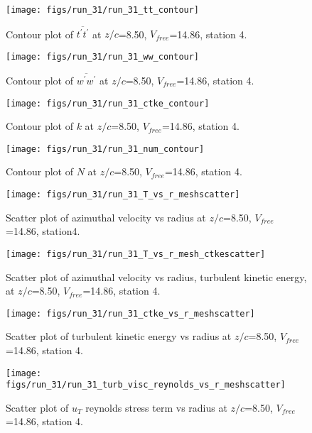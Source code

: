 \begin{figure}[H]
\centering
\texttt{[image: figs/run\_31/run\_31\_tt\_contour]}
\caption{Contour plot of $\overline{t^\prime t^\prime}$ at $z/c$=8.50, $V_{free}$=14.86, station 4.}
\end{figure}


\begin{figure}[H]
\centering
\texttt{[image: figs/run\_31/run\_31\_ww\_contour]}
\caption{Contour plot of $\overline{w^\prime w^\prime}$ at $z/c$=8.50, $V_{free}$=14.86, station 4.}
\end{figure}


\begin{figure}[H]
\centering
\texttt{[image: figs/run\_31/run\_31\_ctke\_contour]}
\caption{Contour plot of $k$ at $z/c$=8.50, $V_{free}$=14.86, station 4.}
\end{figure}


\begin{figure}[H]
\centering
\texttt{[image: figs/run\_31/run\_31\_num\_contour]}
\caption{Contour plot of $N$ at $z/c$=8.50, $V_{free}$=14.86, station 4.}
\end{figure}


\begin{figure}[H]
\centering
\texttt{[image: figs/run\_31/run\_31\_T\_vs\_r\_meshscatter]}
\caption{Scatter plot of azimuthal velocity vs radius at $z/c$=8.50, $V_{free}$=14.86, station4.}
\end{figure}


\begin{figure}[H]
\centering
\texttt{[image: figs/run\_31/run\_31\_T\_vs\_r\_mesh\_ctkescatter]}
\caption{Scatter plot of azimuthal velocity vs radius, turbulent kinetic energy, at $z/c$=8.50, $V_{free}$=14.86, station 4.}
\end{figure}


\begin{figure}[H]
\centering
\texttt{[image: figs/run\_31/run\_31\_ctke\_vs\_r\_meshscatter]}
\caption{Scatter plot of turbulent kinetic energy vs radius at $z/c$=8.50, $V_{free}$=14.86, station 4.}
\end{figure}


\begin{figure}[H]
\centering
\texttt{[image: figs/run\_31/run\_31\_turb\_visc\_reynolds\_vs\_r\_meshscatter]}
\caption{Scatter plot of $
u_T$ reynolds stress term vs radius at $z/c$=8.50, $V_{free}$=14.86, station 4.}
\end{figure}


